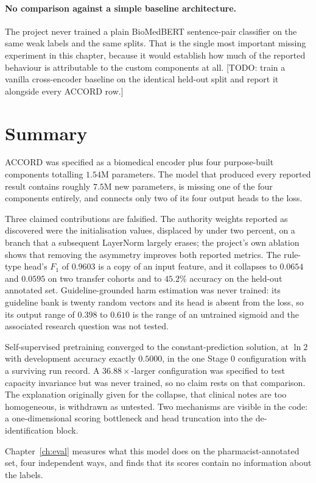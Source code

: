 \paragraph{No comparison against a simple baseline architecture.} The project
never trained a plain BioMedBERT sentence-pair classifier on the same weak
labels and the same splits. That is the single most important missing
experiment in this chapter, because it would establish how much of the reported
behaviour is attributable to the custom components at all.
[TODO: train a vanilla cross-encoder baseline on the identical held-out split
and report it alongside every ACCORD row.]

\section{Summary}
\label{sec:arch-summary}

ACCORD was specified as a biomedical encoder plus four purpose-built components
totalling $1.54$M parameters. The model that produced every reported result
contains roughly $7.5$M new parameters, is missing one of the four components
entirely, and connects only two of its four output heads to the loss.

Three claimed contributions are falsified. The authority weights reported as
discovered were the initialisation values, displaced by under two percent, on a
branch that a subsequent LayerNorm largely erases; the project's own ablation
shows that removing the asymmetry improves both reported metrics. The
rule-type head's $F_1$ of $0.9603$ is a copy of an input feature, and it
collapses to $0.0654$ and $0.0595$ on two transfer cohorts and to $45.2\%$
accuracy on the held-out annotated set. Guideline-grounded harm estimation was
never trained: its guideline bank is twenty random vectors and its head is
absent from the loss, so its output range of $0.398$ to $0.610$ is the range of
an untrained sigmoid and the associated research question was not tested.

Self-supervised pretraining converged to the constant-prediction solution, at
$\ln 2$ with development accuracy exactly $0.5000$, in the one Stage 0
configuration with a surviving run record. A $36.88\times$-larger
configuration was specified to test capacity invariance but was never
trained, so no claim rests on that comparison. The explanation originally
given for the collapse, that clinical notes are too homogeneous, is withdrawn
as untested. Two mechanisms are visible in the code: a one-dimensional
scoring bottleneck and head truncation into the de-identification block.

Chapter~\ref{ch:eval} measures what this model does on the pharmacist-annotated
set, four independent ways, and finds that its scores contain no information
about the labels.
